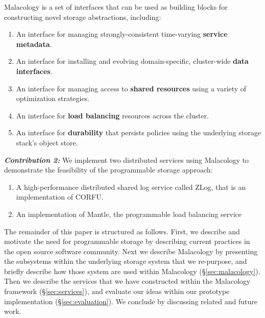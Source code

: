 Malacology is a set of interfaces that can be used as
building blocks for constructing novel storage abstractions, including:

\begin{enumerate}

\item An interface for managing strongly-consistent time-varying \textbf{service
metadata}.

\item An interface for installing and evolving domain-specific, cluster-wide
\textbf{data interfaces}.

\item An interface for managing access to \textbf{shared resources} using a
variety of optimization strategies.

\item An interface for \textbf{load balancing} resources across the cluster.

\item An interface for \textbf{durability} that persists policies using the
underlying storage stack's object store.

\end{enumerate}

{\it \textbf{Contribution 2:}} We implement two distributed services using
Malacology to demonstrate the feasibility of the programmable storage approach:

\begin{enumerate}

\item A high-performance distributed shared log service called ZLog, that is an
implementation of CORFU.~\cite{balakrishnan_corfu_2012}

\item An implementation of Mantle, the programmable load balancing
service~\cite{sevilla:sc15-mantle}

\end{enumerate}

The remainder of this paper is structured as follows. First, we describe and
motivate the need for programmable storage by describing current practices in
the open source software community. Next we describe Malacology by presenting
the subsystems within the underlying storage system that we re-purpose, and
briefly describe how those system are used within Malacology
(\S\ref{sec:malacology}).  Then we describe the services that we have
constructed within the Malacology framework (\S\ref{sec:services}), and
evaluate our ideas within our prototype implementation
(\S\ref{sec:evaluation}).  We conclude by discussing related and future work.
